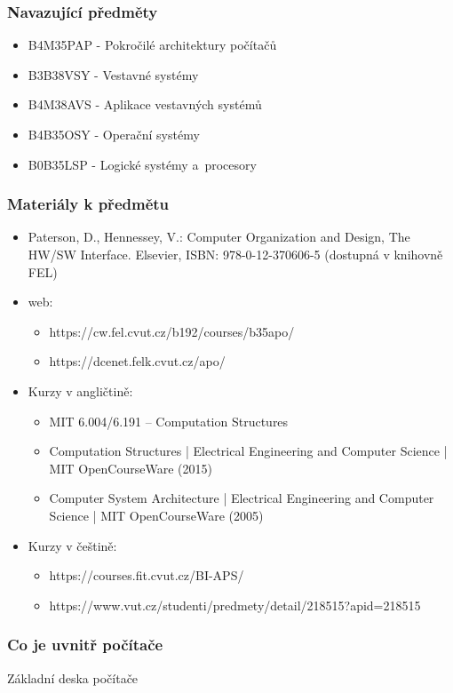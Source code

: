 \documentclass{beamer}
\begin{document}
\begin{frame}
\frametitle{Navazující předměty}

\begin{itemize}
\item B4M35PAP - Pokročilé architektury počítačů
\item B3B38VSY - Vestavné systémy
\item B4M38AVS - Aplikace vestavných systémů
\item B4B35OSY - Operační systémy
\item B0B35LSP - Logické systémy a procesory
\end{itemize}
\end{frame}


\begin{frame}
\frametitle{Materiály k předmětu}
\begin{itemize}
\item Paterson, D., Hennessey, V.: Computer Organization and Design, The HW/SW Interface. Elsevier, ISBN: 978-0-12-370606-5 (dostupná v knihovně FEL)
\item web:
\begin{itemize}
\item https://cw.fel.cvut.cz/b192/courses/b35apo/
\item https://dcenet.felk.cvut.cz/apo/
\end{itemize}
\item Kurzy v angličtině:
\begin{itemize}
\item MIT 6.004/6.191 – Computation Structures
\item Computation Structures | Electrical Engineering and Computer Science | MIT OpenCourseWare (2015)
\item Computer System Architecture | Electrical Engineering and Computer Science | MIT OpenCourseWare (2005)
\end{itemize}
\item Kurzy v češtině:
\begin{itemize}
\item https://courses.fit.cvut.cz/BI-APS/
\item https://www.vut.cz/studenti/predmety/detail/218515?apid=218515
\end{itemize}

\end{itemize}
\end{frame}


\begin{frame}
\frametitle{Co je uvnitř počítače}

Základní deska počítače
\end{frame}
\end{document}
